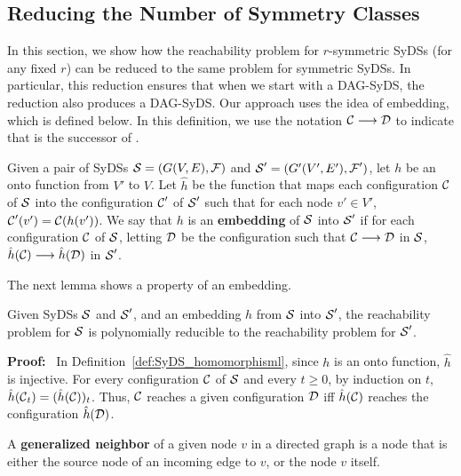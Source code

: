 \subsection{Reducing the Number of Symmetry Classes}
\label{sse:embedding}

In this section, we show how the reachability problem for
$r$-symmetric SyDSs (for any fixed $r$)
can be reduced to the same problem for symmetric SyDSs.
In particular, this reduction ensures that when we start
with a DAG-SyDS, the reduction also produces a DAG-SyDS.
Our approach uses the idea of embedding, which is defined below.
In this definition, we use the notation
$\mbox{$\mathcal{C}$}{} \longrightarrow \mbox{$\mathcal{D}$}$ to indicate that \cald{} is
the successor of \calc.

\begin{definition}\label{def:SyDS_homomorphisml}
Given a pair of SyDSs $\mbox{$\mathcal{S}$} = (G(V,E), \mbox{$\mathcal{F}$})$ and $\mbox{$\mathcal{S}$}' = (G'(V',E'), \mbox{$\mathcal{F}$}')$,
let $h$ be an onto function from $V'$ to $V$.
Let $\hat{h}$ be the function that maps each configuration $\mbox{$\mathcal{C}$}$ of $\mbox{$\mathcal{S}$}$
into the configuration $\mbox{$\mathcal{C}$}'$ of $\mbox{$\mathcal{S}$}'$ 
such that for each node $v' \in V'$, 
$\mbox{$\mathcal{C}$}'(v') = \mbox{$\mathcal{C}$}(h(v'))$.
We say that $h$ is an \textbf{embedding} of $\mbox{$\mathcal{S}$}$ into $\mbox{$\mathcal{S}$}'$
if for each configuration $\mbox{$\mathcal{C}$}$ of $\mbox{$\mathcal{S}$}$,
letting $\mbox{$\mathcal{D}$}$  be the configuration such that 
$\mbox{$\mathcal{C}$} \longrightarrow \mbox{$\mathcal{D}$}$ in $\mbox{$\mathcal{S}$}$,
$\hat{h}(\mbox{$\mathcal{C}$}) \longrightarrow \hat{h}(\mbox{$\mathcal{D}$})$ in $\mbox{$\mathcal{S}$}'$.
\end{definition}

\noindent
The next lemma shows a property of an embedding.

\begin{lemma}\label{lem:embedding_reachability}
 Given SyDSs $\mbox{$\mathcal{S}$}$ and $\mbox{$\mathcal{S}$}'$, and an embedding $h$ from $\mbox{$\mathcal{S}$}$ into  $\mbox{$\mathcal{S}$}'$,
the reachability problem for $\mbox{$\mathcal{S}$}$ is polynomially reducible
to the reachability problem for $\mbox{$\mathcal{S}$}'$.
\end{lemma}

\noindent
\textbf{Proof:}~
In Definition~\ref{def:SyDS_homomorphisml},
since $h$ is an onto function, $\hat{h}$  is injective.
For every configuration $\mbox{$\mathcal{C}$}$ of $\mbox{$\mathcal{S}$}$ and every $t \geq 0$,
by induction on $t$,
$\hat{h}(\mbox{$\mathcal{C}$}_t) = (\hat{h}(\mbox{$\mathcal{C}$}))_t $.
Thus, $\mbox{$\mathcal{C}$}$ reaches a given configuration $\mbox{$\mathcal{D}$}$
iff $\hat{h}(\mbox{$\mathcal{C}$})$ reaches the configuration $\hat{h}(\mbox{$\mathcal{D}$})$.
\QED

\begin{definition}\label{tdef:generalized_neighbor}
A {\bf generalized neighbor} of a given node $v$ in a directed graph is a node that
is either the source node of an incoming edge to $v$, or the node $v$  itself.
\end{definition}

